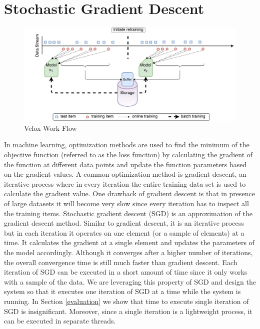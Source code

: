 \documentclass{vldb}
\begin{document}
\section{Stochastic Gradient Descent} \label{sgd}
\begin{figure}[!t]
\centering
\includegraphics[scale = 0.5]{../images/velox-1.pdf}
\caption{Velox Work Flow}
\label{fig:velox-work-flow}
\end{figure}

In machine learning, optimization methods are used to find the minimum of the objective function (referred to as the loss function) by calculating the gradient of the function at different data points and update the function parameters based on the gradient values.
A common optimization method is gradient descent, an iterative process where in every iteration the entire training data set is used to calculate the gradient value.
One drawback of gradient descent is that in presence of large datasets it will become very slow since every iteration has to inspect all the training items.
Stochastic gradient descent (SGD) is an approximation of the gradient descent method. 
Similar to gradient descent, it is an iterative process but in each iteration it operates on one element (or a sample of elements) at a time. 
It calculates the gradient at a single element and updates the parameters of the model accordingly. 
Although it converges after a higher number of iterations, the overall convergence time is still much faster than gradient descent. 
Each iteration of SGD can be executed in a short amount of time since it only works with a sample of the data.
We are leveraging this property of SGD and design the system so that it executes one iteration of SGD at a time while the system is running.
In Section \ref{evaluation} we show that time to execute single iteration of SGD is insignificant.
Moreover, since a single iteration is a lightweight process, it can be executed in separate threads.
\end{document}
